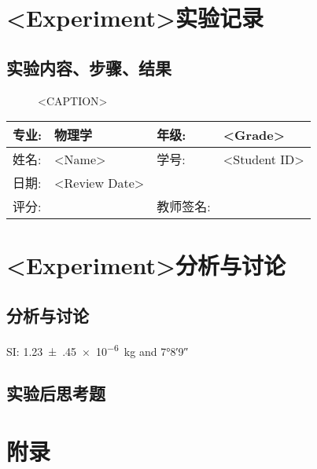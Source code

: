 \documentclass{ctexart}
\newcommand{\experimentname}{<Experiment>}
\newcommand{\student}{<Name>}
\newcommand{\Grade}{<Grade>}
\newcommand{\stuID}{<Student ID>}
\newcommand{\reviewdate}{<Review Date>}
\theoremstyle{ansstyle}
\newcommand{\reviewdata}{%
    \begin{center}
        \begin{tabular}{|p{2cm}|p{4cm}|p{4cm}|p{4cm}|}
            \hline
            专业: & 物理学 & 年级:  & \Grade \\
            \hline
            姓名: & \student & 学号: & \stuID \\
            \hline
            日期: & \reviewdate & & \\
            \hline
            评分: & & 教师签名: & \\
            \hline
        \end{tabular}
    \end{center}%
}
\begin{document}
\section*{\experimentname 实验记录}

\subsection{实验内容、步骤、结果}
\begin{figure}[H]
	\centering
	\caption{<CAPTION>}
\end{figure}

\newpage


\reviewdata

\section*{\experimentname 分析与讨论}


\subsection{分析与讨论}

SI: \SI{1.23(45)e-6}{\kilo\gram} and \ang{7;8;9}

\subsection{实验后思考题}


\appendix

\section{附录}
\end{document}
